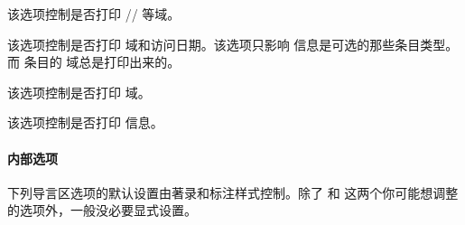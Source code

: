 \begin{optionlist}


该选项控制是否打印 \slash {}\slash {} 等域。


该选项控制是否打印  域和访问日期。该选项只影响  信息是可选的那些条目类型。而  条目的  域总是打印出来的。


该选项控制是否打印  域。


该选项控制是否打印  信息。

\end{optionlist}

\paragraph{内部选项}%
\label{use:opt:pre:int}

下列导言区选项的默认设置由著录和标注样式控制。除了  和  这两个你可能想调整的选项外，一般没必要显式设置。

